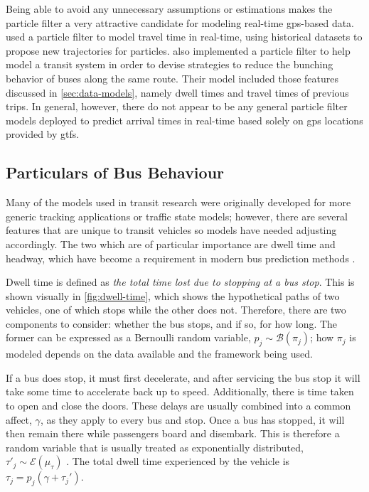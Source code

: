 \documentclass[12pt,a4paper]{article}
\newcommand{\pf}{particle filter}
\begin{document}
Being able to avoid any unnecessary assumptions or estimations makes the
\pf{} a very attractive candidate for modeling real-time \gls{gps}-based data.
\cite{chen-rakha:2014} used a \pf{} to model travel time in real-time,
using historical datasets to propose new trajectories for particles.
\cite{hans-etal:2015} also implemented a \pf{} to help model a transit system
in order to devise strategies
to reduce the bunching behavior of buses along the same route.
Their model included those features discussed in \cref{sec:data-models},
namely dwell times and travel times of previous trips.
In general, however, there do not appear to be any general \pf{} models deployed
to predict arrival times in real-time based solely on \gls{gps} locations provided
by \gls{gtfs}.



\subsection{Particulars of Bus Behaviour}
\label{sec:bus-behaviour}

Many of the models used in transit research were originally developed for 
more generic tracking applications or traffic state models;
however, there are several features that are unique to transit vehicles
so models have needed adjusting accordingly.
The two which are of particular importance are dwell time and headway,
which have become a requirement in modern bus prediction methods
\citep{cn}.


Dwell time is defined as \emph{the total time lost due to stopping at a bus stop}.
This is shown visually in \cref{fig:dwell-time},
which shows the hypothetical paths of two vehicles, one of which stops while the other does not.
Therefore, there are two components to consider:
whether the bus stops, and if so, for how long.
The former can be expressed as a Bernoulli random variable, $p_j \sim \mathcal{B}(\pi_j)$;
how $\pi_j$ is modeled depends on the data available and the framework being used.


If a bus does stop, it must first decelerate,
and after servicing the bus stop it will take some time to accelerate back up to speed.
Additionally, there is time taken to open and close the doors.
These delays are usually combined into a common affect, $\gamma$,
as they apply to every bus and stop.
Once a bus has stopped, it will then remain there while passengers board and disembark.
This is therefore a random variable that is usually treated as exponentially distributed,
$\tau'_j \sim \mathcal{E}(\mu_\tau)$
\citep{cn}.
The total dwell time experienced by the vehicle is $\tau_j = p_j(\gamma + \tau_j')$.
\end{document}

